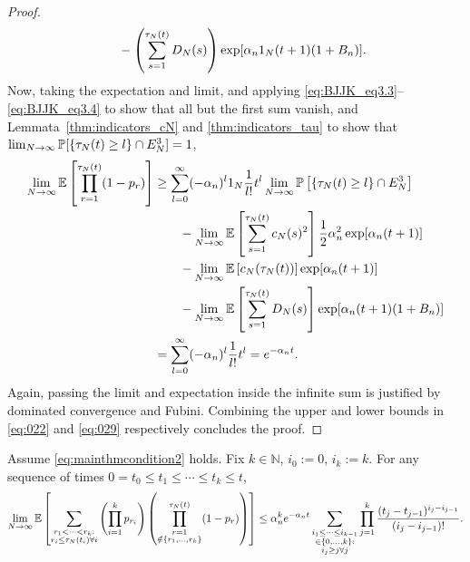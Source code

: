 \begin{proof}
\begin{align}
    &\qquad- \left( \sum_{s=1}^{\tau_N(t)} D_N(s) \right)
        \exp[ \alpha_n 1_N (t+1) (1+B_n) ]. \label{eq:028}
\end{align}
Now, taking the expectation and limit, and applying \eqref{eq:BJJK_eq3.3}--\eqref{eq:BJJK_eq3.4} to show that all but the first sum vanish, and Lemmata~\ref{thm:indicators_cN} and \ref{thm:indicators_tau} to show that $\lim_{N\to\infty} \mathbb{P}[ \{\tau_N(t) \geq l\} \cap E_N^3 ] =1$,
\begin{align}
\lim_{N\to\infty} \mathbb{E} \left[ \prod_{r=1}^{\tau_N(t)} (1-p_r) \right]
&\geq \sum_{l=0}^{\infty} (-\alpha_n)^l 1_N \frac{1}{l!} t^l 
        \lim_{N\to\infty} \mathbb{P}\left[ \{\tau_N(t) \geq l\} \cap E_N^3 \right] \notag\\
    &\qquad- \lim_{N\to\infty} \mathbb{E} \left[ \sum_{s=1}^{\tau_N(t)} c_N(s)^2 \right]
        \frac{1}{2} \alpha_n^2 \exp[ \alpha_n (t+1) ]\notag\\
    &\qquad- \lim_{N\to\infty} \mathbb{E} \left[ c_N(\tau_N(t)) \right] 
        \exp[ \alpha_n (t+1) ] \notag\\
    &\qquad- \lim_{N\to\infty} \mathbb{E} \left[ \sum_{s=1}^{\tau_N(t)} D_N(s) \right]
        \exp[ \alpha_n (t+1) (1+B_n) ] \notag\\
&= \sum_{l=0}^{\infty} (-\alpha_n)^l \frac{1}{l!} t^l
= e^{-\alpha_n t}. \label{eq:029}
\end{align}
Again, passing the limit and expectation inside the infinite sum is justified by dominated convergence and Fubini.
Combining the upper and lower bounds in \eqref{eq:022} and \eqref{eq:029} respectively concludes the proof.
\end{proof}



\begin{lemma}\label{thm:inductionUB}
Assume \eqref{eq:mainthmcondition2} holds.
Fix $k \in \mathbb{N}$, $i_0:=0$, $i_k:=k$. For any sequence of times
$0 = t_0 \leq t_1 \leq \cdots \leq t_k \leq t$,
\begin{equation*}
\lim_{N\to\infty} \mathbb{E} \left[ 
        \sum_{\substack{r_1 <\dots< r_k :\\ r_i \leq \tau_N(t_i) \forall i}}
        \left( \prod_{i=1}^k p_{r_i} \right)
        \left( \prod_{\substack{r=1 \\ \notin \{r_1,\dots,r_k\} }}^{\tau_N(t)} 
        (1-p_r) \right) \right]
\leq \alpha_n^k e^{-\alpha_n t}
        \sum_{\substack{i_1\leq \dots\leq i_{k-1}\\ \in \{0,\dots,k\} :
        \\ i_j \geq j \forall j}} 
        \prod_{j=1}^k \frac{(t_j - t_{j-1})^{i_j - i_{j-1}}}{(i_j - i_{j-1})! } .
\end{equation*}
\end{lemma}

